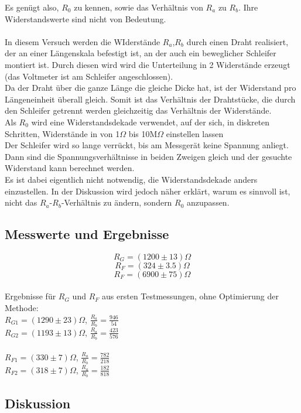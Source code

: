 \documentclass[12pt,a4paper]{article}
\begin{document}
\begin{multicols}{2}
Es genügt also, $R_0$ zu kennen, sowie das Verhältnis von $R_a$ zu $R_b$. Ihre Widerstandswerte sind nicht von Bedeutung.\\
\\
In diesem Versuch werden die WIderstände $R_a$,$R_b$ durch einen Draht realisiert, der an einer Längenskala befestigt ist, an der auch ein beweglicher Schleifer montiert ist. Durch diesen wird wird die Unterteilung in 2 Widerstände erzeugt (das Voltmeter ist am Schleifer angeschlossen).
\\
Da der Draht über die ganze Länge die gleiche Dicke hat, ist der Widerstand pro Längeneinheit überall gleich. Somit ist das Verhältnis der Drahtstücke, die durch den Schleifer getrennt werden gleichzeitig das Verhältnis der Widerstände.\\
Als $R_0$ wird eine Widerstandsdekade verwendet, auf der sich, in diskreten Schritten, Widerstände in von 1$ \Omega$ bis 10M$\Omega$ einstellen lassen
\\
Der Schleifer wird so lange verrückt, bis am Messgerät keine Spannung anliegt. Dann sind die Spannungsverhältnisse in beiden Zweigen gleich und der gesuchte Widerstand kann berechnet werden.\\
Es ist dabei eigentlich nicht notwendig, die Widerstandsdekade anders einzustellen. In der Diskussion wird jedoch näher erklärt, warum es sinnvoll ist, nicht das $R_a$-$R_b$-Verhältnis zu ändern, sondern $R_0$ anzupassen.

\subsection{Messwerte und Ergebnisse}


$$R_G = (1200 \pm 13) \Omega$$
$$R_F = (324 \pm 3.5) \Omega$$
$$R_F = (6900 \pm 75) \Omega$$
\\

\noindent Ergebnisse für $R_G$ und $R_F$ aus ersten Testmessungen, ohne Optimierung der Methode:
\\
$R_{G1} = (1290 \pm 23) \Omega$, $\frac{R_a}{R_b}=\frac{946}{54}$\\
$R_{G2} = (1193\pm 13) \Omega$, $\frac{R_a}{R_b}=\frac{423}{576}$\\
\\
$R_{F1} = (330 \pm 7) \Omega$, $\frac{R_a}{R_b}=\frac{782}{218}$\\
$R_{F2} = (318\pm 7) \Omega$, $\frac{R_a}{R_b}=\frac{182}{818}$\\

\subsection{Diskussion}


\end{multicols}
\end{document}
